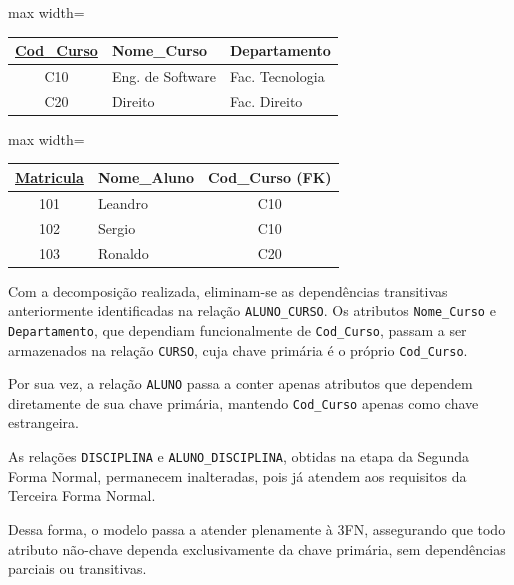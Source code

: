 \begin{tcolorbox}[breakable, colback=blue!5,colframe=blue!40!black,title=Situação exemplo]
    \begin{adjustbox}{max width=\textwidth}
    \begin{tabular}{|c|l|l|}
    \hline
    \textbf{\underline{Cod\_Curso}} & \textbf{Nome\_Curso} & \textbf{Departamento} \\ \hline
    C10 & Eng. de Software & Fac. Tecnologia \\ \hline
    C20 & Direito & Fac. Direito \\ \hline
    \end{tabular}
\end{adjustbox}
    \vspace{0.3cm}
    \label{tab:3fn_curso}

    \vspace{0.5cm}

    \begin{adjustbox}{max width=\textwidth}
    \begin{tabular}{|c|l|c|}
    \hline
    \textbf{\underline{Matricula}} & \textbf{Nome\_Aluno} & \textbf{Cod\_Curso} (FK) \\ \hline
    101 & Leandro & C10 \\ \hline
    102 & Sergio & C10 \\ \hline
    103 & Ronaldo & C20 \\ \hline
    \end{tabular}
\end{adjustbox}
    \vspace{0.3cm}
    \label{tab:3fn_aluno}

    \vspace{0.4cm}

    \justify

    Com a decomposição realizada, eliminam-se as dependências transitivas anteriormente identificadas na relação \texttt{ALUNO\_CURSO}. Os atributos \texttt{Nome\_Curso} e \texttt{Departamento}, que dependiam funcionalmente de \texttt{Cod\_Curso}, passam a ser armazenados na relação \texttt{CURSO}, cuja chave primária é o próprio \texttt{Cod\_Curso}.

    Por sua vez, a relação \texttt{ALUNO} passa a conter apenas atributos que dependem diretamente de sua chave primária, mantendo \texttt{Cod\_Curso} apenas como chave estrangeira.

    As relações \texttt{DISCIPLINA} e \texttt{ALUNO\_DISCIPLINA}, obtidas na etapa da Segunda Forma Normal, permanecem inalteradas, pois já atendem aos requisitos da Terceira Forma Normal.

    Dessa forma, o modelo passa a atender plenamente à 3FN, assegurando que todo atributo não-chave dependa exclusivamente da chave primária, sem dependências parciais ou transitivas.

\end{tcolorbox}

